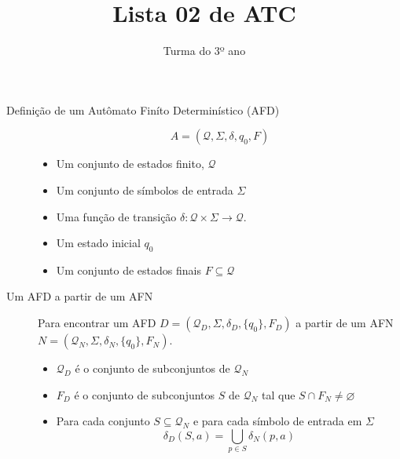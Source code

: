 \documentclass[12pt]{article}
\title{Lista 02 de ATC}
\date{}
\author{Turma do 3º ano}
\def\cQ{\mathcal{Q}}
\def\emptyset{\varnothing}
\begin{document}
 

\maketitle

\begin{description}

\item[Definição de um Autômato Finíto Determinístico (AFD)]
\[A = (\cQ, \Sigma, \delta, q_0, F)\]
\begin{itemize}
\item Um conjunto de estados finito, $\cQ$
\item Um conjunto de símbolos de entrada $\Sigma$
\item Uma função de transição $\delta: \cQ\times\Sigma\rightarrow\cQ$.
\item Um estado inicial $q_0$
\item Um conjunto de estados finais $F\subseteq \cQ$
\end{itemize}



\item[Um AFD a partir de um AFN]
Para encontrar um AFD $D = (\cQ_D, \Sigma, \delta_D, \{q_0\}, F_D)$ a partir de um AFN $N = (\cQ_N, \Sigma, \delta_N, \{q_0\}, F_N)$.

\begin{itemize}

\item $\cQ_D$ é o conjunto de subconjuntos de $\cQ_N$

\item $F_D$ é o conjunto de subconjuntos $S$ de $\cQ_N$ tal que $S\cap F_N\neq\emptyset$

\item Para cada conjunto $S\subseteq \cQ_N$ e para cada símbolo de entrada em $\Sigma$
\[\delta_D(S,a) = \bigcup_{p\in S} \delta_N(p,a)\]

\end{itemize}


\end{description}

\vspace{3em}






\break
\end{document}
